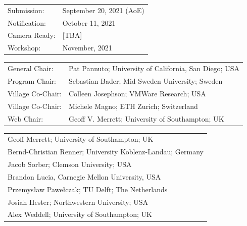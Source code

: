 \documentclass[a4paper,10pt]{scrartcl}
\begin{document}
\vskip4mm
\begin{minipage}{.49\textwidth}
\begin{tcolorbox}[boxsep=0pt, top=2mm, left=2mm, right=2mm, bottom=0mm, arc=5pt, auto outer arc, colback=cfp_lightcolor, colframe=white]
  \renewcommand{\baselinestretch}{0.95} 
  \footnotesize
  \setlength\tabcolsep{0pt}
  \begin{tabular}{p{2.0cm}l}
    Submission:   &  September 20, 2021 (AoE) \\
    Notification: &  October 11, 2021 \\
    Camera Ready: &  [TBA] \\
    Workshop:     &  November, 2021\\
  \end{tabular}
  
  \vskip1mm
  \begin{tabular}{p{2.0cm}l}
  General Chair:       & Pat Pannuto; University of California, San Diego; USA \\     %
  Program Chair:       & Sebastian Bader; Mid Sweden University; Sweden \\     %
  Village Co-Chair:    & Colleen Josephson; VMWare Research; USA \\
  Village Co-Chair:    & Michele Magno; ETH Zurich; Switzerland \\
  Web Chair:           & Geoff V. Merrett; University of Southampton; UK
  \end{tabular}

  \vskip1mm
  \begin{tabular}{l}
  Geoff Merrett; University of Southampton; UK \\
  Bernd-Christian Renner; University Koblenz-Landau; Germany \\
  Jacob Sorber; Clemson University; USA \\
  Brandon Lucia, Carnegie Mellon University, USA \\
  Przemys\textsf{\l{}}aw Pawe\textsf{\l{}}czak; TU Delft; The Netherlands \\
  Josiah Hester; Northwestern University; USA \\
  Alex Weddell; University of Southampton; UK \\
  \end{tabular}


\end{tcolorbox}
\end{minipage}
\end{document}
